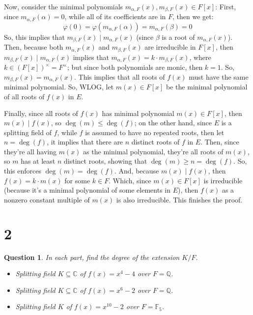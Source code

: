 \documentclass{article}
\newtheorem{question}{Question}
\begin{document}
\begin{itemize}
    Now, consider the minimal polynomials $m_{\alpha,F}(x),m_{\beta,F}(x)\in F[x]$: First, since $m_{\alpha,F}(\alpha)=0$, while all of its coefficients are in $F$, then we get:
    $$\varphi(0)=\varphi(m_{\alpha,F}(\alpha)) = m_{\alpha,F}(\beta) = 0$$
    So, this implies that $m_{\beta,F}(x)\mid m_{\alpha,F}(x)$ (since $\beta$ is a root of $m_{\alpha,F}(x)$). Then, because both $m_{\alpha,F}(x)$ and $m_{\beta,F}(x)$ are irreducible in $F[x]$, then $m_{\beta,F}(x)\mid m_{\alpha,F}(x)$ implies that $m_{\alpha,F}(x)=k\cdot m_{\beta,F}(x)$, where $k\in (F[x])^\times = F^\times$; but since both polynomials are monic, then $k=1$. So, $m_{\beta,F}(x)=m_{\alpha,F}(x)$. This implies that all roots of $f(x)$ must have the same minimal polynomial. So, WLOG, let $m(x)\in F[x]$ be the minimal polynomial of all roots of $f(x)$ in $E$.

    Finally, since all roots of $f(x)$ has minimal polynomial $m(x)\in F[x]$, then $m(x)\mid f(x)$, so $\deg(m)\leq \deg(f)$; on the other hand, since $E$ is a splitting field of $f$, while $f$ is assumed to have no repeated roots, then let $n=\deg(f)$, it implies that there are $n$ distinct roots of $f$ in $E$.  Then, since they're all having $m(x)$ as the minimal polynomial, they're all roots of $m(x)$, so $m$ has at least $n$ distinct roots, showing that $\deg(m)\geq n = \deg(f)$.
    So, this enforces $\deg(m)=\deg(f)$. And, because $m(x)\mid f(x)$, then $f(x)=k\cdot m(x)$ for some $k\in F$. Which, since $m(x)\in F[x]$ is irreducible (because it's a minimal polynomial of some elements in $E$), then $f(x)$ as a nonzero constant multiple of $m(x)$ is also irreducible. This finishes the proof.
\end{itemize}

\break

\section*{2}
\begin{myBox}[]{}
    \begin{question}
        In each part, find the degree of the extension $K/F$.
        \begin{itemize}
            \item[(a)] Splitting field $K\subseteq\mathbb{C}$ of $f(x)=x^4-4$ over $F=\mathbb{Q}$.
            \item[(b)] Splitting field $K\subseteq\mathbb{C}$ of $f(x)=x^6-2$ over $F=\mathbb{Q}$.
            \item[(c)] Splitting field $K$ of $f(x)=x^{10}-2$ over $F=\mathbb{F}_5$.  
        \end{itemize}
    \end{question}
\end{myBox}
\end{document}
